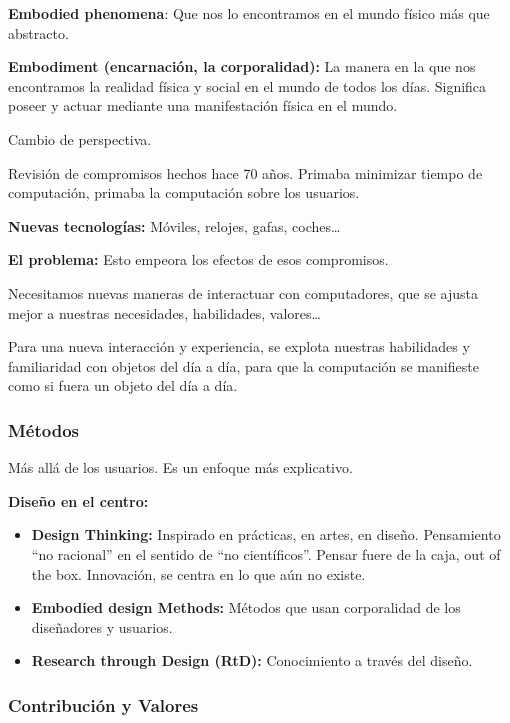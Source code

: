 \documentclass[12pt, twoside, openright]{report} %
\begin{document}
\textbf{Embodied phenomena}: Que nos lo encontramos en el mundo físico
más que abstracto.

\textbf{Embodiment (encarnación, la corporalidad):} La manera en la que
nos encontramos la realidad física y social en el mundo de todos los
días. Significa poseer y actuar mediante una manifestación física en el
mundo.

Cambio de perspectiva.

Revisión de compromisos hechos hace 70 años. Primaba minimizar tiempo de
computación, primaba la computación sobre los usuarios.

\textbf{Nuevas tecnologías:} Móviles, relojes, gafas, coches\ldots{}

\textbf{El problema:} Esto empeora los efectos de esos compromisos.

Necesitamos nuevas maneras de interactuar con computadores, que se
ajusta mejor a nuestras necesidades, habilidades, valores\ldots{}

Para una nueva interacción y experiencia, se explota nuestras habilidades
y familiaridad con objetos del día a día, para que la computación se
manifieste como si fuera un objeto del día a día.

\subsubsection{Métodos}

Más allá de los usuarios. Es un enfoque más explicativo.

\textbf{Diseño en el centro:}

\begin{itemize}
	\item \textbf{Design Thinking:} Inspirado en prácticas, en artes, en diseño.
	      Pensamiento \enquote{no racional} en el sentido de \enquote{no científicos}.
	      Pensar fuere de la caja, out of the box. Innovación, se centra en lo
	      que aún no existe.
	\item \textbf{Embodied design Methods:} Métodos que usan corporalidad de los
	      diseñadores y usuarios.
	\item \textbf{Research through Design (RtD):} Conocimiento a través del
	      diseño.
\end{itemize}

\subsubsection{Contribución y Valores}
\end{document}
